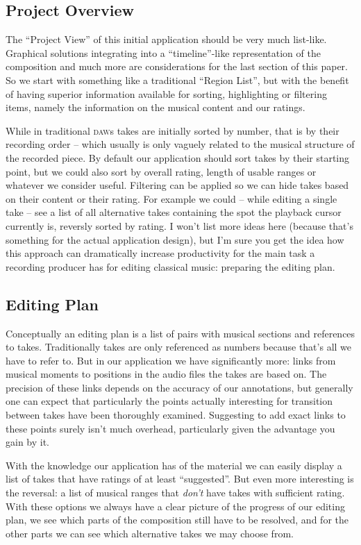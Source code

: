 \documentclass[11pt,a4paper]{article}
\begin{document}
\subsection{Project Overview}
The “Project View” of this initial application should be very much list-like.
Graphical solutions integrating into a “timeline”-like representation of the composition and much more are considerations for the last section of this paper.
So we start with something like a traditional “Region List”, but with the benefit of having superior information available for sorting, highlighting or filtering items, namely the information on the musical content and our ratings.

While in traditional \textsc{daw}s takes are initially sorted by number, that is by their recording order -- which usually is only vaguely related to the musical structure of the recorded piece.
By default our application should sort takes by their starting point, but we could also sort by overall rating, length of usable ranges or whatever we consider useful.
Filtering can be applied so we can hide takes based on their content or their rating.
For example we could -- while editing a single take -- see a list of all alternative takes containing the spot the playback cursor currently is, reversly sorted by rating.
I won't list more ideas here (because that's something for the actual application design), but I'm sure you get the idea how this approach can dramatically increase productivity for the main task a recording producer has for editing classical music: preparing the editing plan.

\subsection{Editing Plan}
Conceptually an editing plan is a list of pairs with musical sections and references to takes.
Traditionally takes are only referenced as numbers because that's all we have to refer to.
But in our application we have significantly more: links from musical moments to positions in the audio files the takes are based on.
The precision of these links depends on the accuracy of our annotations, but generally one can expect that particularly the points actually interesting for transition between takes have been thoroughly examined.
Suggesting to add exact links to these points surely isn't much overhead, particularly given the advantage you gain by it.

With the knowledge our application has of the material we can easily display a list of takes that have ratings of at least “suggested”.
But even more interesting is the reversal: a list of musical ranges that \emph{don't} have takes with sufficient rating.
With these options we always have a clear picture of the progress of our editing plan, we see which parts of the composition still have to be resolved, and for the other parts we can see which alternative takes we may choose from.
\end{document}
